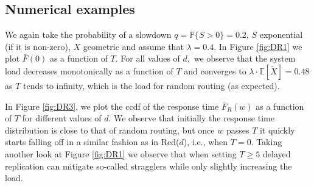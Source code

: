 \documentclass[12pt]{report}
\renewcommand{\P}{\mathbb{P}}
\newcommand{\E}{\mathbb{E}}
\renewcommand{\P}{\mathbb{P}}
\begin{document}
\subsection*{Numerical examples}

We again take the probability of a slowdown $q=\P\{S>0\}=0.2$, $S$ exponential (if it is non-zero), $X$ geometric and
assume that $\lambda=0.4$. In Figure \ref{fig:DR1} we plot $\bar{F}(0)$ as a function of $T$. For all values of $d,$ we observe that the system load decreases monotonically as a function of $T$ and  converges to $\lambda \cdot \E[\tilde X] =0.48$ as $T$ tends to infinity, 
which is the load for random routing (as expected).
 
In Figure \ref{fig:DR3}, we plot the ccdf of the response time $\bar F_R(w)$ as a function of $T$ for different values of $d$. We observe that initially the response time distribution is close to that of random routing, but once $w$ passes $T$ it quickly starts falling off in a similar
fashion as in Red($d$), i.e., when $T=0$. Taking another look at Figure \ref{fig:DR1} we observe that when setting $T \geq 5$ delayed replication can mitigate so-called stragglers while only slightly increasing the load.

%
\end{document}
